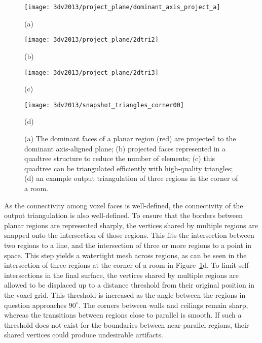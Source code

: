 \documentclass[12pt,onecolumn,oneside]{book}
\begin{document}
\begin{figure}[t]

	\begin{minipage}[b]{0.48\linewidth}
		\centerline{\texttt{[image: 3dv2013/project\_plane/dominant\_axis\_project\_a]}}
		\centerline{(a)}\medskip
	\end{minipage}
	\hfill
	\begin{minipage}[b]{0.48\linewidth}
		\centerline{\texttt{[image: 3dv2013/project\_plane/2dtri2]}}
		\centerline{(b)}\medskip
	\end{minipage}
	
	\begin{minipage}[b]{0.48\linewidth}
		\centerline{\texttt{[image: 3dv2013/project\_plane/2dtri3]}}
		\centerline{(c)}\medskip
	\end{minipage}
	\hfill
	\begin{minipage}[b]{0.48\linewidth}
		\centerline{\texttt{[image: 3dv2013/snapshot\_triangles\_corner00]}}
		\centerline{(d)}\medskip
	\end{minipage}

	\caption[Triangulation of planar regions in voxel carving.]{(a) The dominant faces of a planar region (red) are projected to the dominant axis-aligned plane; (b) projected faces represented in a quadtree structure to reduce the number of elements; (c) this quadtree can be triangulated efficiently with high-quality triangles; (d) an example output triangulation of three regions in the corner of a room.}
	\label{fig:triangulation}

\end{figure}

As the connectivity among voxel faces is well-defined, the connectivity of the output triangulation is also well-defined.  To ensure that the borders between planar regions are represented sharply, the vertices shared by multiple regions are snapped onto the intersection of those regions.  This fits the intersection between two regions to a line, and the intersection of three or more regions to a point in space.  This step yields a watertight mesh across regions, as can be seen in the intersection of three regions at the corner of a room in Figure~\ref{fig:triangulation}d.  To limit self-intersections in the final surface, the vertices shared by multiple regions are allowed to be displaced up to a distance threshold from their original position in the voxel grid.  This threshold is increased as the angle between the regions in question approaches $90^{\circ}$.  The corners between walls and ceilings remain sharp, whereas the transitions between regions close to parallel is smooth.  If such a threshold does not exist for the boundaries between near-parallel regions, their shared vertices could produce undesirable artifacts.
\end{document}
